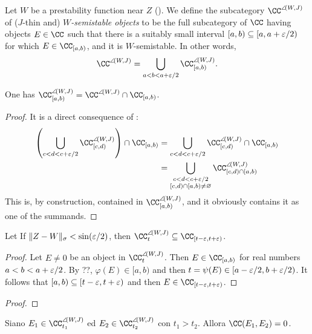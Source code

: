 \begin{definition}\label{W-semistables}
Let $W$ be a prestability function near $Z$ (). We define the subcategory $\CC^{\semi(W,J)}$ of ($J$\hyp{}thin and) \emph{$W$-semistable objects} to be the full subcategory of $\CC$ having objects $E\in \CC$ such that there is a suitably small interval $[a,b)\subseteq [a,a+\varepsilon/2)$ for which $E\in\cab$, and it is $W$-semistable. In other words,
\[
\CC^{\semi(W,J)}= \bigcup_{a<b<a+\eps/2}\CC^{\semi(W,J)}_{[a,b)}.
\]
\end{definition}
\begin{lemma}
One has $\CC^{\semi(W,J)}_{[a,b)}=\CC^{\semi(W,J)}\cap \cab$.
\end{lemma}
\begin{proof}
It is a direct consequence of \aprop {}: 
\begin{align*}
\left(\bigcup_{c<d<c+\eps/2} \CC_{[c,d)}^{\semi(W,J)}\right)\cap \cab &= \bigcup_{c<d<c+\eps/2} \CC_{[c,d)}^{\semi(W,J)} \cap \cab \\
&= \bigcup_{\substack{c<d<c+\eps/2 \\ [c,d)\cap [a,b)\neq \varnothing}} \CC_{[c,d)\cap [a,b)}^{\semi(W,J)} 
\end{align*}
This is, by construction, contained in $\CC^{\semi(W,J)}_{[a,b)}$, and it obviously contains it as one of the summands.
\end{proof}
\begin{lemma}\label{containment}
Let If $\|Z-W\|_\sigma< \sin(\varepsilon/2)$, then $\CC^{\semi(W,J)}_t\subseteq \CC_{[t-\eps,t+\eps)}$.
\end{lemma}
\begin{proof}
Let $E\neq 0$ be an object in $\CC^{\semi(W,J)}_t$. Then $E\in \cab$ for real numbers $a<b<a+\varepsilon/2$. By ??, $\varphi(E)\in [a,b)$ and then $t=\psi(E)\in [a-\varepsilon/2,b+\varepsilon/2)$. It follows that $[a,b)\subseteq [t-\varepsilon,t+\varepsilon)$ and then $E\in \CC_{[t-\eps,t+\eps)}$.
\end{proof}
\begin{lemma}\label{bridge-sette-sei}
\end{lemma}
\begin{proof}
\end{proof}
\begin{proposition}
Siano $E_1\in \CC^{\semi(W,J)}_{t_1}$ ed $E_2\in \CC^{\semi(W,J)}_{t_2}$ con $t_1>t_2$. Allora $\CC(E_1,E_2)=0$.
\end{proposition}
